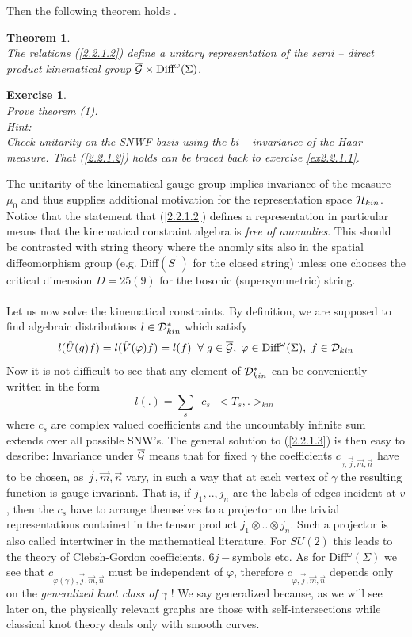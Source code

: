 \documentclass[12pt]{report}
\newtheorem{Theorem}{Theorem}[section]
\newtheorem{Exercise}{Exercise}[section]
\def\be{\begin{equation}}
\def\ee{\end{equation}}
\begin{document}
%
Then the following theorem holds \cite{36a}.
%
\begin{Theorem}
\label{th2.2.1.1} ~~~~\\
The relations (\ref{2.2.1.2}) define a unitary representation of the 
semi -- direct product kinematical group 
$\overline{{\cal G}}\times \mbox{Diff}^\omega(\Sigma)$.
\end{Theorem}
%
\begin{Exercise} \label{ex2.2.1.2}  ~~~~\\
Prove theorem (\ref{th2.2.1.1}).\\
Hint:\\
Check unitarity on the SNWF basis using the bi -- invariance of the Haar
measure. That (\ref{2.2.1.2}) holds can be traced back to exercise 
\ref{ex2.2.1.1}.
\end{Exercise}
%
The unitarity of the kinematical gauge group implies invariance of the 
measure $\mu_0$ and thus supplies additional motivation for the 
representation space ${\cal H}_{kin}$. Notice that the statement that 
(\ref{2.2.1.2}) defines a representation in particular means that the 
kinematical constraint algebra is {\it free of anomalies}. This should be 
contrasted with string theory where the anomly sits also in the spatial
diffeomorphism group (e.g. Diff$(S^1)$ for the closed string) unless one 
chooses the critical dimension $D=25(9)$ for the bosonic (supersymmetric)
string. \\
\\
Let us now solve the kinematical constraints. By definition, we are 
supposed to find algebraic distributions $l\in {\cal D}_{kin}^\ast$
which satisfy
\be \label{2.2.1.3}
l(\hat{U}(g)f)=l(\hat{V}(\varphi)f)=l(f)\;\;\forall\;
g\in\overline{{\cal G}},\;\varphi\in \mbox{Diff}^\omega(\Sigma),\;
f\in {\cal D}_{kin}
\ee
Now it is not difficult to see that any element of ${\cal D}_{kin}^\ast$
can be conveniently written in the form
\be \label{2.2.1.4}
l(.)=\sum_s\;\;c_s\;\;<T_s,.>_{kin}
\ee
where $c_s$ are complex valued coefficients and the uncountably infinite sum
extends over all possible SNW's. The general solution to (\ref{2.2.1.3})
is then easy to describe: Invariance under $\overline{{\cal G}}$ means that
for fixed $\gamma$ the coefficients $c_{\gamma,\vec{j},\vec{m},\vec{n}}$
have to be chosen, as $\vec{j},\vec{m},\vec{n}$ vary, in such a way that 
at each vertex of $\gamma$ the resulting function is gauge invariant.
That is, if $j_1,..,j_n$ are the labels of edges incident at $v$, then 
the $c_s$ have to arrange themselves to a projector on the trivial
representations contained in the tensor product $j_1\otimes..\otimes j_n$.
Such a projector is
also called intertwiner in the mathematical literature. For $SU(2)$ this 
leads to the theory of Clebsh-Gordon coefficients, $6j-$symbols etc.
As for Diff$^\omega(\Sigma)$ we see that 
$c_{\varphi(\gamma),\vec{j},\vec{m},\vec{n}}$ must be independent of 
$\varphi$, therefore $c_{\varphi,\vec{j},\vec{m},\vec{n}}$ depends only
on the {\it generalized knot class of $\gamma$} ! We say generalized 
because, as we will see later on, the physically relevant graphs are 
those with self-intersections while classical knot theory deals only with 
smooth curves.
\end{document}
